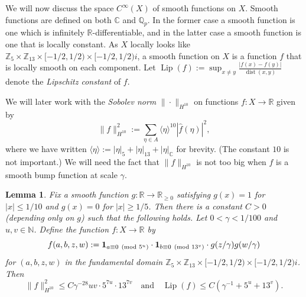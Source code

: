 \documentclass[11pt]{amsart}
\newtheorem{lemma}{Lemma}[section]
\theoremstyle{definition}
\newcommand{\R}{{\mathbb R}}
\DeclareMathOperator{\dist}{dist}
\DeclareMathOperator{\Lip}{Lip}
\begin{document}
We will now discuss the space $C^\infty(X)$ of smooth functions on $X$. Smooth functions are defined on both $\mathbb{C}$ and $\mathbb{Q}_p$.  In the former case a smooth function is one which is infinitely $\R$-differentiable, and in the latter case a smooth function is one that is locally constant.  As $X$ locally looks like $\mathbb{Z}_5 \times \mathbb{Z}_{13} \times [-1/2,1/2) \times [-1/2,1/2)i$, a smooth function on $X$ is a function $f$ that is locally smooth on each component.  Let $\Lip(f):=\sup_{x \neq y}\frac{|f(x)-f(y)|}{\dist(x,y)}$ denote the \emph{Lipschitz constant} of $f$.

We will later work with the \emph{Sobolev norm} $\| \cdot \|_{H^{10}}$ on functions $f:X \to \mathbb{R}$ given by $$\|f\|_{H^{10}}^2:=\sum_{\eta \in A} \langle \eta \rangle^{10} |\widehat{f}(\eta)|^2,$$ where we have written $\langle \eta \rangle:=|\eta|_5+|\eta|_{13}+|\eta|_\mathbb{C}$ for brevity.  (The constant $10$ is not important.)  We will need the fact that $\|f\|_{H^{10}}$ is not too big when $f$ is a smooth bump function at scale $\gamma$.

\begin{lemma}\label{lem:smoothapproximation}
Fix a smooth function $g: \mathbb{R} \to \mathbb{R}_{\geq 0}$ satisfying $g(x)=1$ for $|x| \leq 1/10$ and $g(x)=0$ for $|x| \geq 1/5$.  Then there is a constant $C>0$ (depending only on $g$) such that the following holds.  Let $0<\gamma<1/100$ and $u,v \in \mathbb{N}$.  Define the function $f: X \to \mathbb{R}$ by
$$f(a,b,z,w):={\bf 1}_{a \equiv 0 \pmod{5^u}} \cdot {\bf 1}_{b \equiv 0 \pmod{13^v}} \cdot g(z/\gamma)g(w/\gamma)$$
for $(a,b,z,w)$ in the fundamental domain $\mathbb{Z}_5 \times \mathbb{Z}_{13} \times [-1/2,1/2) \times [-1/2,1/2)i$.  Then
$$\|f\|_{H^{10}}^2 \leq C \gamma^{-28}uv \cdot 5^{7u} \cdot 13^{7v} \quad \text{and} \quad \Lip(f) \leq C(\gamma^{-1}+5^u+13^v).$$
\end{lemma}
\end{document}
